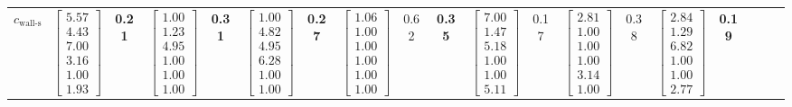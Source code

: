 \documentclass[conference]{IEEEtran}
\begin{document}
\begin{table}[tbh]
\begin{tabular}{l | cc cc cc cc c | cc cc cc cc c}
        $c_{\text{wall-s}}$
        & \multicolumn{1}{c}{$\begin{bmatrix} 5.57\\4.43\\7.00\\3.16\\1.00\\1.93 \end{bmatrix}$} & \textbf{0.21}
        & \multicolumn{1}{c}{$\begin{bmatrix} 1.00\\1.23\\4.95\\1.00\\1.00\\1.00 \end{bmatrix}$} & \textbf{0.31}
        & \multicolumn{1}{c}{$\begin{bmatrix} 1.00\\4.82\\4.95\\6.28\\1.00\\1.00 \end{bmatrix}$} & \textbf{0.27}
        & \multicolumn{1}{c}{$\begin{bmatrix} 1.06\\1.00\\1.00\\1.00\\1.00\\1.00 \end{bmatrix}$} & 0.62 & \textbf{0.35}
        & \multicolumn{1}{c}{$\begin{bmatrix} 7.00\\1.47\\5.18\\1.00\\1.00\\5.11 \end{bmatrix}$} & 0.17
        & \multicolumn{1}{c}{$\begin{bmatrix} 2.81\\1.00\\1.00\\1.00\\3.14\\1.00 \end{bmatrix}$} & 0.38
        & \multicolumn{1}{c}{$\begin{bmatrix} 2.84\\1.29\\6.82\\1.00\\1.00\\2.77 \end{bmatrix}$} & \textbf{0.19}

\end{tabular}
\end{table}
\end{document}
